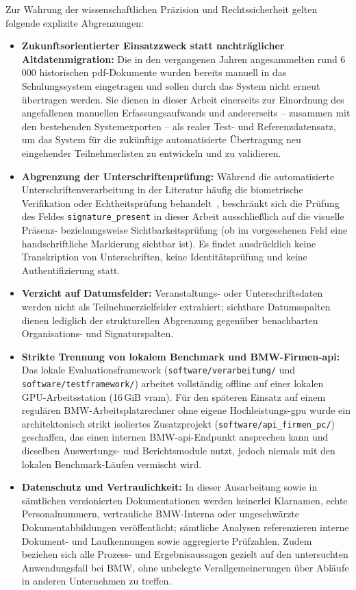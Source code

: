 Zur Wahrung der wissenschaftlichen Präzision und Rechtssicherheit gelten folgende explizite Abgrenzungen:
\begin{itemize}
  \item \textbf{Zukunftsorientierter Einsatzzweck statt nachträglicher Altdatenmigration:} Die in den vergangenen Jahren angesammelten rund 6\,000 historischen \ac{pdf}-Dokumente wurden bereits manuell in das Schulungssystem eingetragen und sollen durch das System nicht erneut übertragen werden. Sie dienen in dieser Arbeit einerseits zur Einordnung des angefallenen manuellen Erfassungsaufwands und andererseits -- zusammen mit den bestehenden Systemexporten -- als realer Test- und Referenzdatensatz, um das System für die zukünftige automatisierte Übertragung neu eingehender Teilnehmerlisten zu entwickeln und zu validieren.
  \item \textbf{Abgrenzung der Unterschriftenprüfung:} Während die automatisierte Unterschriftenverarbeitung in der Literatur häufig die biometrische Verifikation oder Echtheitsprüfung behandelt~\cite{Diaz2019Signature}, beschränkt sich die Prüfung des Feldes \texttt{signature\_present} in dieser Arbeit ausschließlich auf die visuelle Präsenz- beziehungsweise Sichtbarkeitsprüfung (ob im vorgesehenen Feld eine handschriftliche Markierung sichtbar ist). Es findet ausdrücklich keine Transkription von Unterschriften, keine Identitätsprüfung und keine Authentifizierung statt.
  \item \textbf{Verzicht auf Datumsfelder:} Veranstaltungs- oder Unterschriftsdaten werden nicht als Teilnehmerzielfelder extrahiert; sichtbare Datumsspalten dienen lediglich der strukturellen Abgrenzung gegenüber benachbarten Organisations- und Signaturspalten.
  \item \textbf{Strikte Trennung von lokalem Benchmark und BMW-Firmen-\ac{api}:} Das lokale Evaluationsframework (\texttt{software/verarbeitung/} und \texttt{software/testframework/}) arbeitet vollständig offline auf einer lokalen GPU-Arbeitsstation (\mbox{16\,GiB} \ac{vram}). Für den späteren Einsatz auf einem regulären BMW-Arbeitsplatzrechner ohne eigene Hochleistungs-\ac{gpu} wurde ein architektonisch strikt isoliertes Zusatzprojekt (\texttt{software/api\_firmen\_pc/}) geschaffen, das einen internen BMW-\ac{api}-Endpunkt ansprechen kann und dieselben Auswertungs- und Berichtsmodule nutzt, jedoch niemals mit den lokalen Benchmark-Läufen vermischt wird.
  \item \textbf{Datenschutz und Vertraulichkeit:} In dieser Ausarbeitung sowie in sämtlichen versionierten Dokumentationen werden keinerlei Klarnamen, echte Personalnummern, vertrauliche BMW-Interna oder ungeschwärzte Dokumentabbildungen veröffentlicht; sämtliche Analysen referenzieren interne Dokument- und Laufkennungen sowie aggregierte Prüfzahlen. Zudem beziehen sich alle Prozess- und Ergebnisaussagen gezielt auf den untersuchten Anwendungsfall bei BMW, ohne unbelegte Verallgemeinerungen über Abläufe in anderen Unternehmen zu treffen.

\end{itemize}
